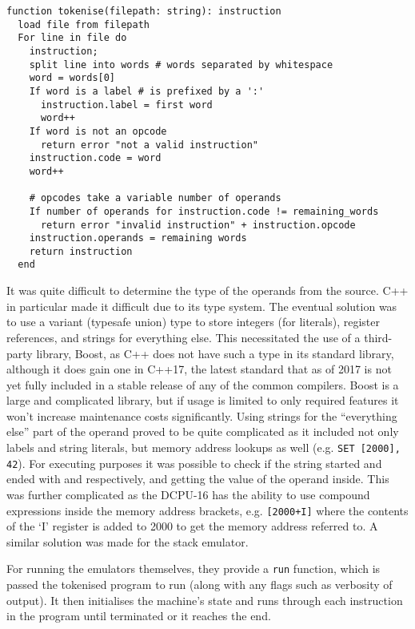 \begin{lstlisting}[caption={Tokenising algorithm for the DCPU-16}]
function tokenise(filepath: string): instruction
  load file from filepath
  For line in file do
    instruction;
    split line into words # words separated by whitespace
    word = words[0]
    If word is a label # is prefixed by a ':'
      instruction.label = first word
      word++
    If word is not an opcode
      return error "not a valid instruction"
    instruction.code = word
    word++

    # opcodes take a variable number of operands
    If number of operands for instruction.code != remaining_words
      return error "invalid instruction" + instruction.opcode
    instruction.operands = remaining words
    return instruction
  end
\end{lstlisting}

It was quite difficult to determine the type of the operands from the source.
C++ in particular made it difficult due to its type system. The eventual
solution was to use a variant (typesafe union) type to store integers (for
literals), register references, and strings for everything else. This
necessitated the use of a third-party library, Boost, as C++ does not have such
a type in its standard library, although it does gain one in C++17, the latest
standard that as of 2017 is not yet fully included in a stable release of any of
the common compilers. Boost is a large and complicated library, but if usage is
limited to only required features it won't increase maintenance costs
significantly.  Using strings for the ``everything else'' part of the operand
proved to be quite complicated as it included not only labels and string
literals, but memory address lookups as well (e.g.  \lstinline{SET [2000], 42}).
For executing purposes it was possible to check if the string started and ended
with \texttt{\rbrack} and \texttt{\rbrack} respectively, and getting the value
of the operand inside. This was further complicated as the DCPU-16 has the
ability to use compound expressions inside the memory address brackets, e.g.
\lstinline{[2000+I]} where the contents of the `I' register is added to 2000 to
get the memory address referred to. A similar solution was made for the stack
emulator.

For running the emulators themselves, they provide a \lstinline{run} function,
which is passed the tokenised program to run (along with any flags such as
verbosity of output). It then initialises the machine's state and runs through
each instruction in the program until terminated or it reaches the end.

